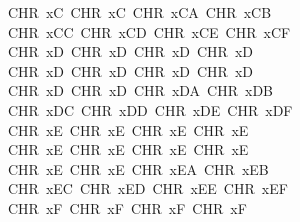 \begin{isabellebody}
\ \ \ \ CHR\ {}xC{}{\isacharcomma}{\kern0pt}\ CHR\ {}xC{}{\isacharcomma}{\kern0pt}\ CHR\ {}xCA{\isacharcomma}{\kern0pt}\ CHR\ {}xCB{\isacharcomma}{\kern0pt}\isanewline
\ \ \ \ CHR\ {}xCC{\isacharcomma}{\kern0pt}\ CHR\ {}xCD{\isacharcomma}{\kern0pt}\ CHR\ {}xCE{\isacharcomma}{\kern0pt}\ CHR\ {}xCF{\isacharcomma}{\kern0pt}\isanewline
\ \ \ \ CHR\ {}xD{}{\isacharcomma}{\kern0pt}\ CHR\ {}xD{}{\isacharcomma}{\kern0pt}\ CHR\ {}xD{}{\isacharcomma}{\kern0pt}\ CHR\ {}xD{}{\isacharcomma}{\kern0pt}\isanewline
\ \ \ \ CHR\ {}xD{}{\isacharcomma}{\kern0pt}\ CHR\ {}xD{}{\isacharcomma}{\kern0pt}\ CHR\ {}xD{}{\isacharcomma}{\kern0pt}\ CHR\ {}xD{}{\isacharcomma}{\kern0pt}\isanewline
\ \ \ \ CHR\ {}xD{}{\isacharcomma}{\kern0pt}\ CHR\ {}xD{}{\isacharcomma}{\kern0pt}\ CHR\ {}xDA{\isacharcomma}{\kern0pt}\ CHR\ {}xDB{\isacharcomma}{\kern0pt}\isanewline
\ \ \ \ CHR\ {}xDC{\isacharcomma}{\kern0pt}\ CHR\ {}xDD{\isacharcomma}{\kern0pt}\ CHR\ {}xDE{\isacharcomma}{\kern0pt}\ CHR\ {}xDF{\isacharcomma}{\kern0pt}\isanewline
\ \ \ \ CHR\ {}xE{}{\isacharcomma}{\kern0pt}\ CHR\ {}xE{}{\isacharcomma}{\kern0pt}\ CHR\ {}xE{}{\isacharcomma}{\kern0pt}\ CHR\ {}xE{}{\isacharcomma}{\kern0pt}\isanewline
\ \ \ \ CHR\ {}xE{}{\isacharcomma}{\kern0pt}\ CHR\ {}xE{}{\isacharcomma}{\kern0pt}\ CHR\ {}xE{}{\isacharcomma}{\kern0pt}\ CHR\ {}xE{}{\isacharcomma}{\kern0pt}\isanewline
\ \ \ \ CHR\ {}xE{}{\isacharcomma}{\kern0pt}\ CHR\ {}xE{}{\isacharcomma}{\kern0pt}\ CHR\ {}xEA{\isacharcomma}{\kern0pt}\ CHR\ {}xEB{\isacharcomma}{\kern0pt}\isanewline
\ \ \ \ CHR\ {}xEC{\isacharcomma}{\kern0pt}\ CHR\ {}xED{\isacharcomma}{\kern0pt}\ CHR\ {}xEE{\isacharcomma}{\kern0pt}\ CHR\ {}xEF{\isacharcomma}{\kern0pt}\isanewline
\ \ \ \ CHR\ {}xF{}{\isacharcomma}{\kern0pt}\ CHR\ {}xF{}{\isacharcomma}{\kern0pt}\ CHR\ {}xF{}{\isacharcomma}{\kern0pt}\ CHR\ {}xF{}{\isacharcomma}{\kern0pt}\isanewline

\end{isabellebody}
